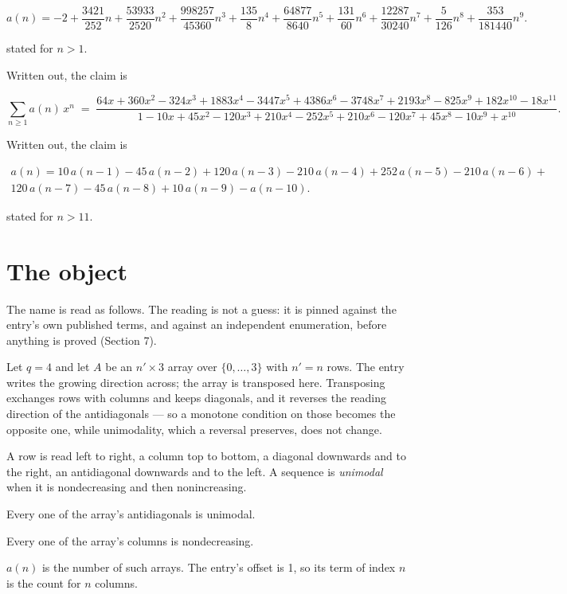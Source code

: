 \documentclass[11pt]{article}
\theoremstyle{definition}
\begin{document}
\[a(n) = -2 + \frac{3421}{252}n + \frac{53933}{2520}n^{2} + \frac{998257}{45360}n^{3} + \frac{135}{8}n^{4} + \frac{64877}{8640}n^{5} + \frac{131}{60}n^{6} + \frac{12287}{30240}n^{7} + \frac{5}{126}n^{8} + \frac{353}{181440}n^{9}.\]

stated for $n > 1$.

Written out, the claim is

\[\sum_{n \ge 1} a(n)\,x^n \;=\; \frac{64x + 360x^{2} - 324x^{3} + 1883x^{4} - 3447x^{5} + 4386x^{6} - 3748x^{7} + 2193x^{8} - 825x^{9} + 182x^{10} - 18x^{11}}{1 - 10x + 45x^{2} - 120x^{3} + 210x^{4} - 252x^{5} + 210x^{6} - 120x^{7} + 45x^{8} - 10x^{9} + x^{10}}.\]

Written out, the claim is

\begin{multline*} a(n) = 10\,a(n-1) - 45\,a(n-2) + 120\,a(n-3) - 210\,a(n-4) + 252\,a(n-5) - 210\,a(n-6) + \\ 120\,a(n-7) - 45\,a(n-8) + 10\,a(n-9) - a(n-10). \end{multline*}

stated for $n > 11$.

\section{The object}

The name is read as follows. The reading is not a guess: it is pinned against the entry's own published terms, and against an independent enumeration, before anything is proved (Section 7).

Let $q = 4$ and let $A$ be an $n' \times 3$ array over $\{0,\dots,3\}$ with $n' = n$ rows. The entry writes the growing direction across; the array is transposed here. Transposing exchanges rows with columns and keeps diagonals, and it reverses the reading direction of the antidiagonals --- so a monotone condition on those becomes the opposite one, while unimodality, which a reversal preserves, does not change.

A row is read left to right, a column top to bottom, a diagonal downwards and to the right, an antidiagonal downwards and to the left. A sequence is {\itshape unimodal} when it is nondecreasing and then nonincreasing.

Every one of the array's antidiagonals is unimodal.

Every one of the array's columns is nondecreasing.

$a(n)$ is the number of such arrays. The entry's offset is 1, so its term of index $n$ is the count for $n$ columns.
\end{document}
